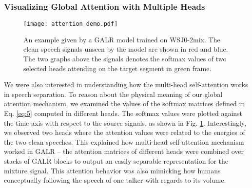 \documentclass{article}
\begin{document}
\subsubsection{Visualizing Global Attention with Multiple Heads}
\begin{figure}[th!]
 \centering
    \texttt{[image: attention\_demo.pdf]}
\caption{An example given by a GALR model trained on WSJ0-2mix. The clean speech signals unseen by the model are shown in red and blue. The two graphs above the signals denotes the softmax values of two selected heads attending on the target segment in green frame.}
\label{fig:attn}
\vspace{-0.2cm}
\end{figure}
We were also interested in understanding how the multi-head self-attention works in speech separation. To reason about the physical meaning of our global attention mechanism, we examined the values of the softmax matrices defined in Eq. \ref{eq:5} computed in different heads. The softmax values were plotted against the time axis with respect to the source signals, as shown in Fig. \ref{fig:attn}. Interestingly, we observed two heads where the attention values were related to the energies of the two clean speeches. This explained how multi-head self-attention mechanism worked in GALR -- the attention matrices of different heads were combined over stacks of GALR blocks to output an easily separable representation for the mixture signal. This attention behavior was also mimicking how humans conceptually following the speech of one talker with regards to its volume.
\end{document}
